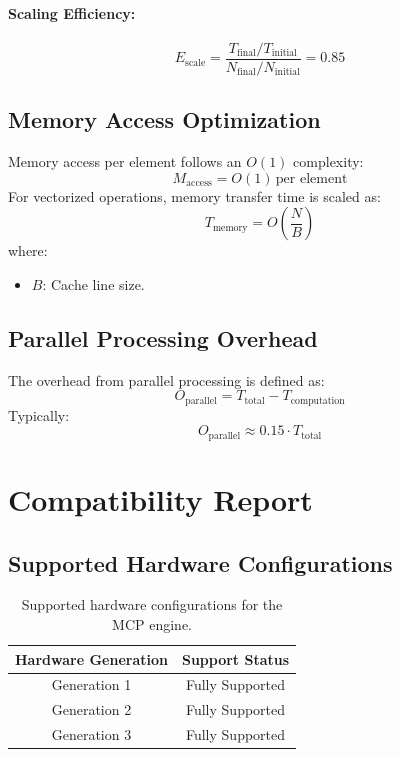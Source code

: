 \documentclass{article}
\theoremstyle{plain}
\begin{document}
\paragraph{Scaling Efficiency:}
\begin{equation}
E_{\text{scale}} = \frac{T_{\text{final}} / T_{\text{initial}}}{N_{\text{final}} / N_{\text{initial}}} = 0.85
\end{equation}

\subsection{Memory Access Optimization}
Memory access per element follows an $O(1)$ complexity:
\begin{equation}
M_{\text{access}} = O(1) \, \text{per element}
\end{equation}
For vectorized operations, memory transfer time is scaled as:
\begin{equation}
T_{\text{memory}} = O\left(\frac{N}{B}\right)
\end{equation}
where:
\begin{itemize}
    \item $B$: Cache line size.
\end{itemize}

\subsection{Parallel Processing Overhead}
The overhead from parallel processing is defined as:
\begin{equation}
O_{\text{parallel}} = T_{\text{total}} - T_{\text{computation}}
\end{equation}
Typically:
\begin{equation}
O_{\text{parallel}} \approx 0.15 \cdot T_{\text{total}}
\end{equation}

\section{Compatibility Report}

\subsection{Supported Hardware Configurations}
\begin{table}[h!]
\centering
\begin{tabular}{|c|c|}
\hline
\textbf{Hardware Generation} & \textbf{Support Status} \\ \hline
Generation 1                 & Fully Supported         \\ \hline
Generation 2                 & Fully Supported         \\ \hline
Generation 3                 & Fully Supported         \\ \hline
\end{tabular}
\caption{Supported hardware configurations for the MCP engine.}
\label{tab:supported_hardware}
\end{table}
\end{document}
